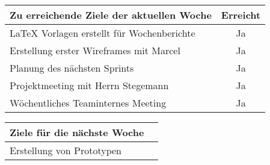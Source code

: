\begin{tabularx}{\textwidth}{Xc}
    \arrayrulecolor{OliveGreen}
    \toprule
    {\bfseries Zu erreichende Ziele der aktuellen Woche} & {\bfseries Erreicht} \\
    \midrule[2pt]
    LaTeX Vorlagen erstellt für Wochenberichte           &Ja                    \\
    \rowcolor{OliveGreen!15}
    Erstellung erster Wireframes mit Marcel              &Ja                    \\
    \rowcolor{White}
    Planung des nächsten Sprints                         &Ja                    \\
    \rowcolor{OliveGreen!15}
    Projektmeeting mit Herrn Stegemann                   &Ja                    \\
    \rowcolor{White}
    Wöchentliches Teaminternes Meeting                   &Ja                    \\
    \bottomrule[2pt]
\end{tabularx}
%
\vspace{1cm}
%
\begin{tabularx}{\textwidth}{Xc}
    \arrayrulecolor{OliveGreen}
    \toprule
    {\bfseries Ziele für die nächste Woche}              &                      \\
    \midrule[2pt]
    Erstellung von Prototypen                            &                      \\
\end{tabularx}
